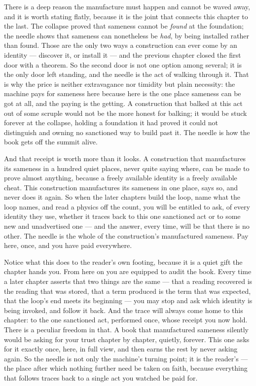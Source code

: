 There is a deep reason the manufacture must happen and cannot be waved away, and it is worth stating flatly,
because it is the joint that connects this chapter to the last. The collapse proved that sameness cannot be
\emph{found} at the foundation; the needle shows that sameness can nonetheless be \emph{had}, by being installed
rather than found. Those are the only two ways a construction can ever come by an identity --- discover it, or
install it --- and the previous chapter closed the first door with a theorem. So the second door is not one option
among several; it is the only door left standing, and the needle is the act of walking through it. That is why the
price is neither extravagance nor timidity but plain necessity: the machine pays for sameness here because here is
the one place sameness can be got at all, and the paying is the getting. A construction that balked at this act
out of some scruple would not be the more honest for balking; it would be stuck forever at the collapse, holding a
foundation it had proved it could not distinguish and owning no sanctioned way to build past it. The needle is how
the book gets off the summit alive.

And that receipt is worth more than it looks. A construction that manufactures its sameness in a hundred quiet
places, never quite saying where, can be made to prove almost anything, because a freely available identity is a
freely available cheat. This construction manufactures its sameness in one place, says so, and never does it
again. So when the later chapters build the loop, name what the loop names, and read a physics off the count, you
will be entitled to ask, of every identity they use, whether it traces back to this one sanctioned act or to some
new and unadvertised one --- and the answer, every time, will be that there is no other. The needle is the whole
of the construction's manufactured sameness. Pay here, once, and you have paid everywhere.

Notice what this does to the reader's own footing, because it is a quiet gift the chapter hands you. From here on
you are equipped to audit the book. Every time a later chapter asserts that two things are the same --- that a
reading recovered is the reading that was stored, that a term produced is the term that was expected, that the
loop's end meets its beginning --- you may stop and ask which identity is being invoked, and follow it back. And
the trace will always come home to this chapter: to the one sanctioned act, performed once, whose receipt you now
hold. There is a peculiar freedom in that. A book that manufactured sameness silently would be asking for your
trust chapter by chapter, quietly, forever. This one asks for it exactly once, here, in full view, and then earns
the rest by never asking again. So the needle is not only the machine's turning point; it is the reader's ---
the place after which nothing further need be taken on faith, because everything that follows traces back to a
single act you watched be paid for.

